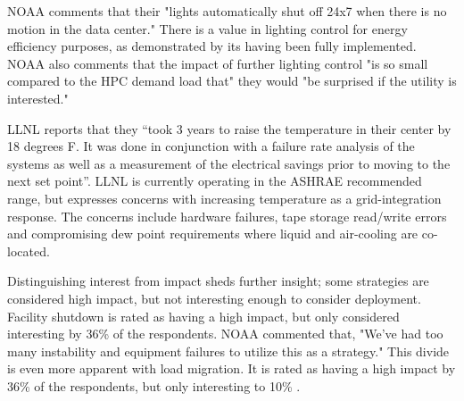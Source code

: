 NOAA comments that their "lights automatically shut off 24x7 
when there is no motion in the data center."  There is a value in lighting control for 
energy efficiency purposes, as demonstrated by its having been fully implemented.  NOAA also comments that
the impact of further lighting control "is so small compared to the HPC demand load that" they would "be surprised 
if the utility is interested."  

LLNL reports that they “took 3 years to raise the temperature in their center by 18 degrees F.  
It was done in conjunction with a failure rate analysis of the systems as well as a measurement of the 
electrical savings prior to moving to the next set point”.  LLNL is currently operating in the ASHRAE 
recommended range, but expresses concerns with increasing temperature as a grid-integration response.  The 
concerns include hardware failures, 
tape storage read/write errors and compromising dew point requirements where liquid and air-cooling are co-located.

Distinguishing interest from impact sheds further insight; some strategies are 
considered high impact, but not interesting enough to consider deployment.  Facility
shutdown is rated as having a high impact, but only
considered interesting by 36\% of the respondents.  NOAA commented that, 
"We've had too many instability and equipment failures to utilize this as a strategy."  This divide is even more
apparent with load migration.  It is rated as having a high impact by 36\% of the
respondents, but only interesting to 10\% .  




